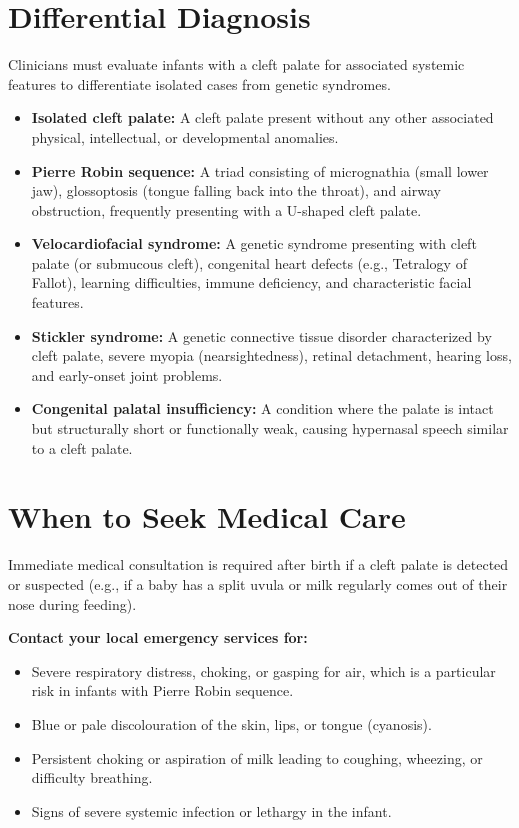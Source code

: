\section*{Differential Diagnosis}
Clinicians must evaluate infants with a cleft palate for associated systemic features to differentiate isolated cases from genetic syndromes.
\begin{itemize}
    \item \textbf{Isolated cleft palate:} A cleft palate present without any other associated physical, intellectual, or developmental anomalies.
    \item \textbf{Pierre Robin sequence:} A triad consisting of micrognathia (small lower jaw), glossoptosis (tongue falling back into the throat), and airway obstruction, frequently presenting with a U-shaped cleft palate.
    \item \textbf{Velocardiofacial syndrome:} A genetic syndrome presenting with cleft palate (or submucous cleft), congenital heart defects (e.g., Tetralogy of Fallot), learning difficulties, immune deficiency, and characteristic facial features.
    \item \textbf{Stickler syndrome:} A genetic connective tissue disorder characterized by cleft palate, severe myopia (nearsightedness), retinal detachment, hearing loss, and early-onset joint problems.
    \item \textbf{Congenital palatal insufficiency:} A condition where the palate is intact but structurally short or functionally weak, causing hypernasal speech similar to a cleft palate.
\end{itemize}

\section*{When to Seek Medical Care}
Immediate medical consultation is required after birth if a cleft palate is detected or suspected (e.g., if a baby has a split uvula or milk regularly comes out of their nose during feeding).

\textbf{Contact your local emergency services for:}
\begin{itemize}
    \item Severe respiratory distress, choking, or gasping for air, which is a particular risk in infants with Pierre Robin sequence.
    \item Blue or pale discolouration of the skin, lips, or tongue (cyanosis).
    \item Persistent choking or aspiration of milk leading to coughing, wheezing, or difficulty breathing.
    \item Signs of severe systemic infection or lethargy in the infant.
\end{itemize}


